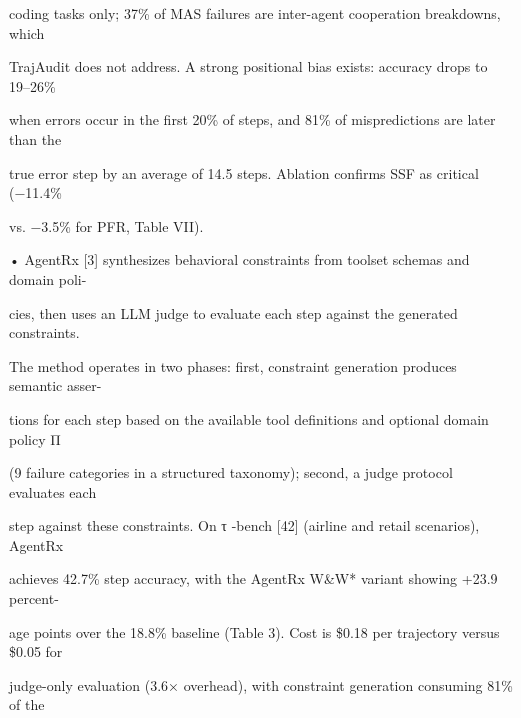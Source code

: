 \begin{flushleft}
\noindent  coding tasks only; 37\% of MAS failures are inter-agent cooperation breakdowns, which\par
\noindent  TrajAudit does not address. A strong positional bias exists: accuracy drops to 19–26\%\par
\noindent  when errors occur in the first 20\% of steps, and 81\% of mispredictions are later than the\par
\noindent  true error step by an average of 14.5 steps. Ablation confirms SSF as critical (−11.4\%\par
\noindent  vs. −3.5\% for PFR, Table VII).\par
\noindent  • AgentRx [3] synthesizes behavioral constraints from toolset schemas and domain poli-\par
\noindent  cies, then uses an LLM judge to evaluate each step against the generated constraints.\par
\noindent  The method operates in two phases: first, constraint generation produces semantic asser-\par
\noindent  tions for each step based on the available tool definitions and optional domain policy Π\par
\noindent  (9 failure categories in a structured taxonomy); second, a judge protocol evaluates each\par
\noindent  step against these constraints. On τ -bench [42] (airline and retail scenarios), AgentRx\par
\noindent  achieves 42.7\% step accuracy, with the AgentRx W\&W* variant showing +23.9 percent-\par
\noindent  age points over the 18.8\% baseline (Table 3). Cost is \$0.18 per trajectory versus \$0.05 for\par
\noindent  judge-only evaluation (3.6× overhead), with constraint generation consuming 81\% of the\par
\end{flushleft}
